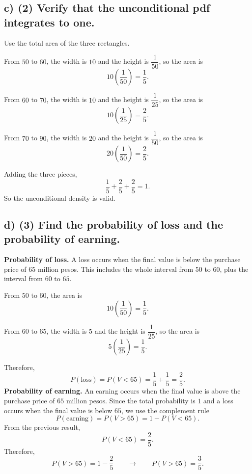 	
	\subsection*{c) \textbf{(2)} Verify that the unconditional pdf integrates to one.}
	\label{subsec:two-scenario-inventory-investment-c2-c}
	Use the total area of the three rectangles.
	
	From $50$ to $60$, the width is $10$ and the height is $\dfrac{1}{50}$, so the area is
	\[
	10\left(\frac{1}{50}\right)=\frac{1}{5}.
	\]
	
	From $60$ to $70$, the width is $10$ and the height is $\dfrac{1}{25}$, so the area is
	\[
	10\left(\frac{1}{25}\right)=\frac{2}{5}.
	\]
	
	From $70$ to $90$, the width is $20$ and the height is $\dfrac{1}{50}$, so the area is
	\[
	20\left(\frac{1}{50}\right)=\frac{2}{5}.
	\]
	
	Adding the three pieces,
	\[
	\frac{1}{5}+\frac{2}{5}+\frac{2}{5}=1.
	\]
	So the unconditional density is valid.
	
	
	\subsection*{d) \textbf{(3)} Find the probability of loss and the probability of earning.}
	\label{subsec:two-scenario-inventory-investment-c2-d}
	\textbf{Probability of loss.} A loss occurs when the final value is below the purchase price of $65$ million pesos. This includes the whole interval from $50$ to $60$, plus the interval from $60$ to $65$.
	
	From $50$ to $60$, the area is
	\[
	10\left(\frac{1}{50}\right)=\frac{1}{5}.
	\]
	
	From $60$ to $65$, the width is $5$ and the height is $\dfrac{1}{25}$, so the area is
	\[
	5\left(\frac{1}{25}\right)=\frac{1}{5}.
	\]
	
	Therefore,
	\[
	P(\text{loss})=P(V<65)=\frac{1}{5}+\frac{1}{5}=\frac{2}{5}.
	\]
	\textbf{Probability of earning.}
	An earning occurs when the final value is above the purchase price of $65$ million pesos. Since the total probability is $1$ and a loss occurs when the final value is below $65$, we use the complement rule
	\[
	P(\text{earning})=P(V>65)=1-P(V<65).
	\]
	From the previous result,
	\[
	P(V<65)=\frac{2}{5}.
	\]
	Therefore,
	\[
	P(V>65)=1-\frac{2}{5}\qquad \longrightarrow \qquad P(V>65)=\frac{3}{5}.
	\]
	
